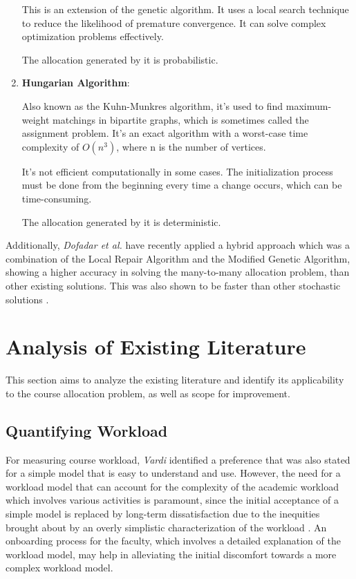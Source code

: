 \begin{enumerate}
        This is an extension of the genetic algorithm. It uses a local search technique to reduce the likelihood of premature convergence.
        It can solve complex optimization problems effectively.

        The allocation generated by it is probabilistic.

  \item \textbf{Hungarian Algorithm}:

        Also known as the Kuhn-Munkres algorithm, it's used to find maximum-weight matchings in bipartite graphs, which is sometimes called the assignment problem.
        It's an exact algorithm with a worst-case time complexity of $O(n^3)$, where n is the number of vertices.

        It's not efficient computationally in some cases. The initialization process must be done from the beginning every time a change occurs, which can be time-consuming.

        The allocation generated by it is deterministic.
\end{enumerate}

Additionally, \textit{Dofadar et al.} have recently applied a hybrid approach which was a combination of the Local Repair Algorithm and the Modified Genetic Algorithm, showing a higher accuracy in solving the many-to-many allocation problem, than other existing solutions. This was also shown to be faster than other stochastic solutions \cite{dofadar2021hybrid}.

\section{Analysis of Existing Literature}

This section aims to analyze the existing literature and identify its applicability to the course allocation problem, as well as scope for improvement.

\subsection{Quantifying Workload}

For measuring course workload, \textit{Vardi} identified a preference that was also stated for a simple model that is easy to understand and use. However, the need for a workload model that can account for the complexity of the academic workload which involves various activities is paramount, since the initial acceptance of a simple model is replaced by long-term dissatisfaction due to the inequities brought about by an overly simplistic characterization of the workload \cite{vardi2009impacts}. An onboarding process for the faculty, which involves a detailed explanation of the workload model, may help in alleviating the initial discomfort towards a more complex workload model.

